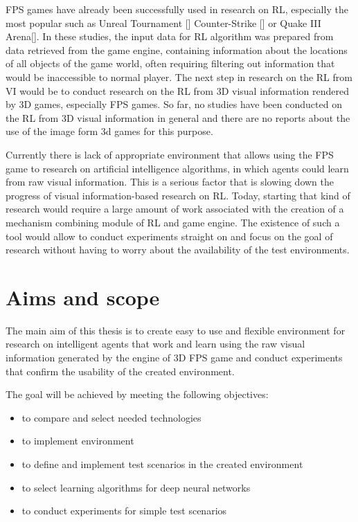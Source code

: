 FPS games have already been successfully used in research on RL, especially the most popular such as Unreal Tournament [] Counter-Strike [] or Quake III Arena[].
In these studies, the input data for RL algorithm was prepared from data retrieved from the game engine, containing information about the locations of all objects of the game world, often requiring filtering out information that would be inaccessible to normal player.
The next step in research on the RL from VI would be to conduct research on the RL from 3D visual information rendered by 3D games, especially FPS games.
So far, no studies have been conducted on the RL from 3D visual information in general and there are no reports about the use of the image form 3d games for this purpose.


Currently there is lack of appropriate environment that allows using the FPS game to research on artificial intelligence algorithms, in which agents could learn from raw visual information.
This is a serious factor that is slowing down the progress of visual information-based research on RL.
Today, starting that kind of research would require a large amount of work associated with the creation of a mechanism combining module of RL and game engine.
The existence of such a tool would allow to conduct experiments straight on and focus on the goal of research without having to worry about the availability of the test environments.

\section{Aims and scope}


The main aim of this thesis is to create easy to use and flexible environment for research on intelligent agents that work and learn using the raw visual information generated by the engine of 3D FPS game and conduct experiments that confirm the usability of the created environment.

The goal will be achieved by meeting the following objectives:
\begin{itemize}
 \item to compare and select needed technologies
 \item to implement environment
 \item to define and implement test scenarios in the created environment
 \item to select learning algorithms for deep neural networks
 \item to conduct experiments for simple test scenarios
\end{itemize}



